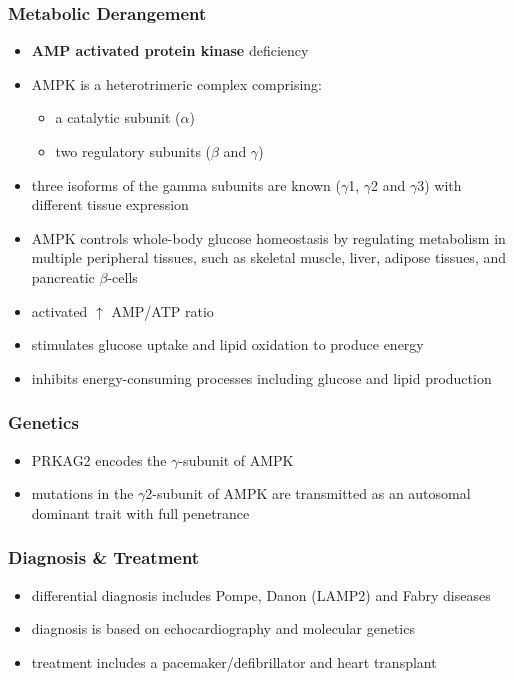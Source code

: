 \documentclass{scrartcl}
\begin{document}
\subsubsection{Metabolic Derangement}
\label{sec:org2e14cec}
\begin{itemize}
\item \textbf{AMP activated protein kinase} deficiency
\item AMPK is a heterotrimeric complex comprising:
\begin{itemize}
\item a catalytic subunit (\(\alpha\))
\item two regulatory subunits (\(\beta\) and \(\gamma\))
\end{itemize}
\item three isoforms of the gamma subunits are known (\(\gamma\)1, \(\gamma\)2 and \(\gamma\)3) with different tissue
expression
\item AMPK controls whole-body glucose homeostasis by regulating metabolism in multiple peripheral tissues, such as
skeletal muscle, liver, adipose tissues, and pancreatic \(\beta\)-cells
\item activated \(\uparrow\) AMP/ATP ratio
\item stimulates glucose uptake and lipid oxidation to produce energy
\item inhibits energy-consuming processes including glucose and lipid production
\end{itemize}
\subsubsection{Genetics}
\label{sec:orgd826be4}
\begin{itemize}
\item PRKAG2 encodes the \(\gamma\)-subunit of AMPK
\item mutations in the \(\gamma\)2-subunit of AMPK are transmitted as an
autosomal dominant trait with full penetrance
\end{itemize}

\subsubsection{Diagnosis \& Treatment}
\label{sec:org5fb302a}
\begin{itemize}
\item differential diagnosis includes Pompe, Danon (LAMP2) and Fabry diseases
\item diagnosis is based on echocardiography and molecular genetics
\item treatment includes a pacemaker/defibrillator and heart transplant
\end{itemize}
\end{document}
